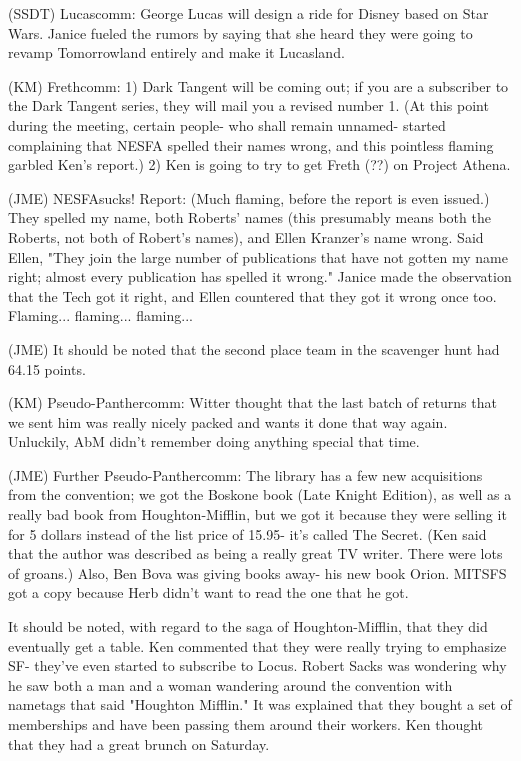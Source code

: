 \documentclass[12pt]{article}
\begin{document}
(SSDT) Lucascomm: George Lucas will design a ride for Disney based on Star Wars. Janice fueled the rumors by saying that she heard they were going to revamp Tomorrowland entirely and make it Lucasland.

(KM) Frethcomm: 1) Dark Tangent will be coming out; if you are a subscriber to the Dark Tangent series, they will mail you a revised number 1. (At this point during the meeting, certain people- who shall remain unnamed- started complaining that NESFA spelled their names wrong, and this pointless flaming garbled Ken's report.) 2) Ken is going to try to get Freth (??) on Project Athena.

(JME) NESFAsucks! Report: (Much flaming, before the report is even issued.) They spelled my name, both Roberts' names (this presumably means both the Roberts, not both of Robert's names), and Ellen Kranzer's name wrong. Said Ellen, "They join the large number of publications that have not gotten my name right; almost every publication has spelled it wrong." Janice made the observation that the Tech got it right, and Ellen countered that they got it wrong once too. Flaming... flaming... flaming...

(JME) It should be noted that the second place team in the scavenger hunt had 64.15 points.

(KM) Pseudo-Panthercomm: Witter thought that the last batch of returns that we sent him was really nicely packed and wants it done that way again. Unluckily, AbM didn't remember doing anything special that time.

(JME) Further Pseudo-Panthercomm: The library has a few new acquisitions from the convention; we got the Boskone book (Late Knight Edition), as well as a really bad book from Houghton-Mifflin, but we got it because they were selling it for 5 dollars instead of the list price of 15.95- it's called The Secret. (Ken said that the author was described as being a really great TV writer. There were lots of groans.) Also, Ben Bova was giving books away- his new book Orion. MITSFS got a copy because Herb didn't want to read the one that he got.

It should be noted, with regard to the saga of Houghton-Mifflin, that they did eventually get a table. Ken commented that they were really trying to emphasize SF- they've even started to subscribe to Locus. Robert Sacks was wondering why he saw both a man and a woman wandering around the convention with nametags that said "Houghton Mifflin." It was explained that they bought a set of memberships and have been passing them around their workers. Ken thought that they had a great brunch on Saturday.
\end{document}
